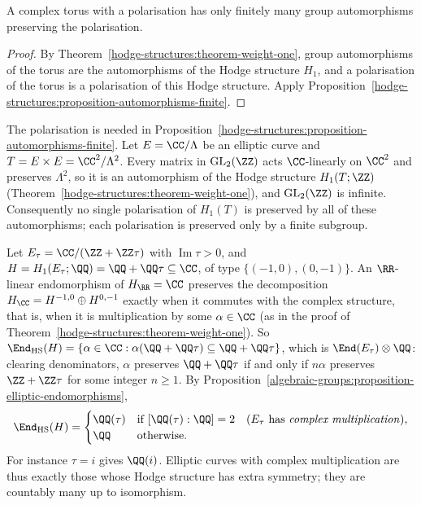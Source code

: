 \begin{corollary}\label{hodge-structures:corollary-torus-automorphisms}
A complex torus with a polarisation has only finitely many group automorphisms preserving the polarisation.
\end{corollary}

\begin{proof}
By Theorem~\ref{hodge-structures:theorem-weight-one}, group automorphisms of the torus are the automorphisms of the Hodge structure $H_1$, and a polarisation of the torus is a polarisation of
this Hodge structure. Apply Proposition~\ref{hodge-structures:proposition-automorphisms-finite}.
\end{proof}

\begin{counterexample}\label{hodge-structures:counterexample-infinite-automorphisms}
The polarisation is needed in Proposition~\ref{hodge-structures:proposition-automorphisms-finite}. Let $E = \CC/\Lambda$ be an elliptic curve and $T = E \times E = \CC^2/\Lambda^2$. Every matrix in
$\mathrm{GL}_2(\ZZ)$ acts $\CC$-linearly on $\CC^2$ and preserves $\Lambda^2$, so it is an automorphism of the Hodge structure $H_1(T; \ZZ)$ (Theorem~\ref{hodge-structures:theorem-weight-one}), and
$\mathrm{GL}_2(\ZZ)$ is infinite. Consequently no single polarisation of $H_1(T)$ is preserved by all of these automorphisms; each polarisation is preserved only by a finite subgroup.
\end{counterexample}

\begin{example}\label{hodge-structures:example-complex-multiplication}
Let $E_\tau = \CC/(\ZZ + \ZZ\tau)$ with $\operatorname{Im}\tau > 0$, and $H = H_1(E_\tau; \QQ) = \QQ + \QQ\tau \subseteq \CC$, of type $\{(-1,0), (0,-1)\}$. An $\RR$-linear endomorphism of $H_\RR = \CC$ preserves the
decomposition $H_\CC = H^{-1,0} \oplus H^{0,-1}$ exactly when it commutes with the complex structure, that is, when it is multiplication by some $\alpha \in \CC$ (as in the proof of
Theorem~\ref{hodge-structures:theorem-weight-one}). So $\End_{\mathrm{HS}}(H) = \{\alpha \in \CC : \alpha(\QQ + \QQ\tau) \subseteq \QQ + \QQ\tau\}$, which is $\End(E_\tau) \otimes \QQ$: clearing denominators,
$\alpha$ preserves $\QQ + \QQ\tau$ if and only if $n\alpha$ preserves $\ZZ + \ZZ\tau$ for some integer $n \geq 1$. By Proposition~\ref{algebraic-groups:proposition-elliptic-endomorphisms},
\[
\End_{\mathrm{HS}}(H) = \begin{cases}\QQ(\tau) & \text{if } [\QQ(\tau) : \QQ] = 2 \quad (\text{$E_\tau$ has \emph{complex multiplication}}),\\ \QQ & \text{otherwise.}\end{cases}
\]
For instance $\tau = i$ gives $\QQ(i)$. Elliptic curves with complex multiplication are thus exactly those whose Hodge structure has extra symmetry; they are countably many up to isomorphism.
\end{example}

